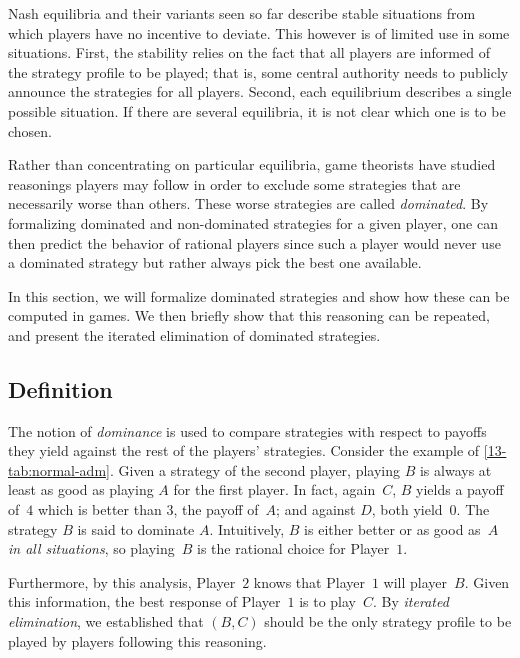 Nash equilibria and their variants seen so far describe stable situations
from which players have no incentive to deviate. This however is of limited use
in some situations. First, the stability relies on the fact that all players are informed
of the strategy profile to be played; that is, some central authority needs to publicly
announce the strategies for all players. Second, each equilibrium describes a single possible
situation. If there are several equilibria, it is not clear which one is to be chosen.

Rather than concentrating on particular equilibria, game theorists have studied
reasonings players may follow in order to exclude some strategies that are necessarily worse than others.
These worse strategies are called \emph{dominated}.
By formalizing dominated and non-dominated strategies for a given player, one can then predict the behavior of rational players
since such a player would never use a dominated strategy but rather always pick the best one available.

In this section, we will formalize dominated strategies and show how these can be computed in games.
We then briefly show that this reasoning can be repeated, and present the iterated elimination of dominated strategies.

\subsection{Definition}\label{definition-1}
The notion of \emph{dominance} is used to compare strategies 
with respect to payoffs they yield against the rest of the players' strategies.
Consider the example of \ref{13-tab:normal-adm}.
Given a strategy of the second player, playing $B$ is always at least as good
as playing $A$ for the first player.
In fact, again~$C$, $B$ yields a payoff of~$4$ which is better than $3$, the payoff of~$A$;
and against $D$, both yield~$0$.
The strategy $B$ is said to dominate $A$. Intuitively, 
$B$ is either better or as good as~$A$ \emph{in all situations}, so 
playing~$B$ is the rational choice for Player~$1$.

Furthermore, by this analysis, Player~$2$ knows that Player~$1$ will player~$B$.
Given this information, the best response of Player~$1$ is to play~$C$.
By \emph{iterated elimination}, we established that
$(B, C)$ should be the only strategy profile to be played by players following this reasoning.

